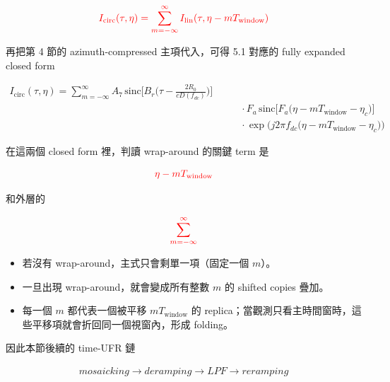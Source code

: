 \documentclass[10pt]{article}
\providecommand{\tightlist}{%
  \setlength{\itemsep}{0pt}\setlength{\parskip}{0pt}}
\begin{document}
\begin{equation}
\begin{aligned} {\color{red}{I_{\mathrm{circ}}(\tau,\eta) = \sum_{m=-\infty}^{\infty} I_{\mathrm{lin}}(\tau,\eta-mT_{\mathrm{window}})}} \end{aligned}
\end{equation}

再把第 4 節的 azimuth-compressed 主項代入，可得 5.1 對應的 fully
expanded closed form

\begin{equation}
\begin{aligned}
I_{\mathrm{circ}}(\tau,\eta)=
\sum_{m=-\infty}^{\infty}
A_7\,
\mathrm{sinc}\biggl[ B_r\biggl( \tau-\frac{2R_0}{cD(f_{dc})} \biggr) \biggr]\\
&\qquad \cdot
F_a\,\mathrm{sinc}\biggl[ F_a\bigl(\eta-mT_{\mathrm{window}}-\eta_c\bigr) \biggr]\\
&\qquad \cdot
\exp\biggl( j2\pi f_{dc}\bigl(\eta-mT_{\mathrm{window}}-\eta_c\bigr) \biggr)
\end{aligned}
\end{equation}

在這兩個 closed form 裡，判讀 wrap-around 的關鍵 term 是

\begin{equation}
\begin{aligned} {\color{red}{\eta-mT_{\mathrm{window}}}} \end{aligned}
\end{equation}

和外層的

\begin{equation}
\begin{aligned} {\color{red}{\sum_{m=-\infty}^{\infty}}} \end{aligned}
\end{equation}

\begin{itemize}
\tightlist
\item
  若沒有 wrap-around，主式只會剩單一項（固定一個 \(m\)）。
\item
  一旦出現 wrap-around，就會變成所有整數 \(m\) 的 shifted copies 疊加。
\item
  每一個 \(m\) 都代表一個被平移 \(mT_{\mathrm{window}}\) 的
  replica；當觀測只看主時間窗時，這些平移項就會折回同一個視窗內，形成
  folding。
\end{itemize}

因此本節後續的 time-UFR 鏈

\begin{equation}
\begin{aligned} mosaicking \rightarrow deramping \rightarrow LPF \rightarrow reramping \end{aligned}
\end{equation}
\end{document}

